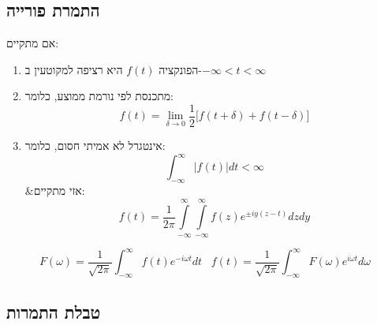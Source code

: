\documentclass{tstextbook}
\begin{document}
\subsection{התמרת פורייה}

\begin{theorem}
אם מתקיים:

  \begin{enumerate}
    \item הפונקציה \(f(t)\) היא רציפה למקוטעין ב-\(-\infty<t<\infty\)


    \item מתכנסת לפי נורמת ממוצע, כלומר: 
$$f(t)=\operatorname*{lim}_{\delta\to0}\frac{1}{2}\bigl[f(t+\delta)+f(t-\delta)\bigr]$$


    \item אינטגרל לא אמיתי חסום, כלומר: 
$$\int_{-\infty}^{\infty}\left|f(t)\right|d t<\infty$$
&אזי מתקיים:
$$f(t)=\frac{1}{2\pi}\int\limits_{-\infty}^{\infty}\int\limits_{-\infty}^{\infty}f(z)e^{\pm i y(z-t)}d z d y$$


  \end{enumerate}
\end{theorem}
\begin{proposition}
$$F\left( \omega \right)\!=\!\frac{1}{\sqrt{2\pi}}\int_{-\infty}^\infty f(t)e^{-i\omega t}dt\;\;\; f(t)\!=\!\frac{1}{\sqrt{2\pi}}\int_{-\infty}^\infty F\left( \omega \right)e^{i\omega t}d\omega$$

\end{proposition}
\subsection{טבלת התמרות}
\end{document}
